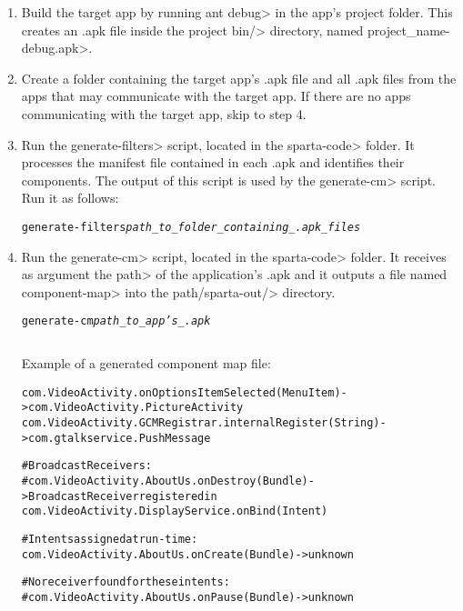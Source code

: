 \begin{enumerate}

\item
Build the target app by running \<ant debug> in the app's project folder. This
creates an .apk file inside the project \<bin/> directory, named
\<project\_name-debug.apk>.

\item
Create a folder containing the target app's .apk file and all .apk files from
the apps that may communicate with the target app. If there are no apps
communicating with the target app, skip to step 4.

\item
Run the \<generate-filters> script, located in the \<sparta-code> folder. It
processes the manifest file contained in each .apk and identifies their
components. The output of this script is used by the \<generate-cm> script.
Run it as follows:
\begin{alltt}
    generate-filters   \textit{path\_to\_folder\_containing\_.apk\_files}
\end{alltt}

\item
Run the \<generate-cm> script, located in the \<sparta-code> folder. It
receives as argument the \<path> of the application's .apk and it outputs a file
named \<component-map> into the \<path/sparta-out/> directory.
\begin{alltt}
    generate-cm   \textit{path\_to\_app's\_.apk}
\end{alltt}

\begin{Verbatim}

\end{Verbatim}
Example of a generated component map file:
\begin{alltt}
com.VideoActivity.onOptionsItemSelected(MenuItem) -> com.VideoActivity.PictureActivity
com.VideoActivity.GCMRegistrar.internalRegister(String) -> com.gtalkservice.PushMessage

#Broadcast Receivers:
#com.VideoActivity.AboutUs.onDestroy(Bundle) -> BroadcastReceiver registered in
                                com.VideoActivity.DisplayService.onBind(Intent)

#Intents assigned at run-time:
com.VideoActivity.AboutUs.onCreate(Bundle) -> unknown

#No receiver found for these intents:
#com.VideoActivity.AboutUs.onPause(Bundle) -> unknown


\end{alltt}
\end{enumerate}
